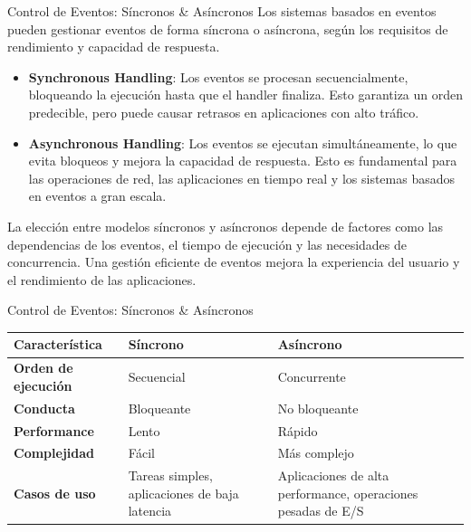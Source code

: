 \documentclass[11pt]{beamer}
\begin{document}
	\begin{frame}{Control de Eventos: Síncronos \& Asíncronos}
		\small
	Los sistemas basados en eventos pueden gestionar eventos de forma síncrona o asíncrona, según los requisitos de rendimiento y capacidad de respuesta.
	\begin{itemize}
		\item \textbf{Synchronous Handling}: Los eventos se procesan secuencialmente, bloqueando la ejecución hasta que el handler finaliza. Esto garantiza un orden predecible, pero puede causar retrasos en aplicaciones con alto tráfico.
		\item \textbf{Asynchronous Handling}: Los eventos se ejecutan simultáneamente, lo que evita bloqueos y mejora la capacidad de respuesta. Esto es fundamental para las operaciones de red, las aplicaciones en tiempo real y los sistemas basados en eventos a gran escala.
	\end{itemize}
	La elección entre modelos síncronos y asíncronos depende de factores como las dependencias de los eventos, el tiempo de ejecución y las necesidades de concurrencia.
	Una gestión eficiente de eventos mejora la experiencia del usuario y el rendimiento de las aplicaciones.	
	\end{frame}
	
	
	\begin{frame}{Control de Eventos: Síncronos \& Asíncronos}
		\small
		\begin{table}
			\centering
			\renewcommand{\arraystretch}{1.2}
			\begin{tabular}{|p{3cm}|p{4cm}|p{4cm}|}
				\hline
				\textbf{Característica} & \textbf{Síncrono} & \textbf{Asíncrono} \\ \hline
				\textbf{Orden de ejecución} & Secuencial & Concurrente \\ \hline
				\textbf{Conducta} & Bloqueante & No bloqueante \\ \hline
				\textbf{Performance} & Lento & Rápido \\ \hline
				\textbf{Complejidad} & Fácil & Más complejo \\ \hline
				\textbf{Casos de uso} & 
				Tareas simples, aplicaciones de baja latencia &
				Aplicaciones de alta performance, operaciones pesadas de E/S \\ \hline
			\end{tabular}
		\end{table}
	\end{frame}
	
\end{document}
